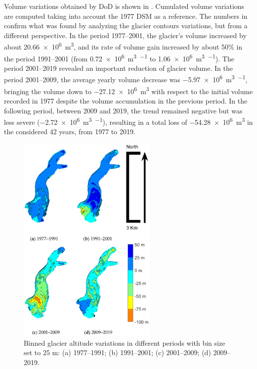 {{Volume variations obtained by DoD is shown in .
Cumulated volume variations are computed taking into account the 1977 DSM as a reference.
The numbers in  confirm what was found by analyzing the glacier contours variations, but from a different perspective. 
In the period 1977–2001, the glacier’s volume increased by about \SI[retain-explicit-plus]{+20.66e6}{\cubic\meter}, and its rate of volume gain increased by about 50\% in the period 1991–2001 (from \SI[retain-explicit-plus]{+0.72e6}{\cubic\meter\per\year} to \SI[retain-explicit-plus]{+1.06e6}{\cubic\meter\per\year}). 
The period 2001–2019 revealed an important reduction of glacier volume.
In the period 2001–2009, the average yearly volume decrease was \SI{-5.97e6}{\cubic\meter\per\year}, bringing the volume down to \SI{-27.12e6}{\cubic\meter} with respect to the initial volume recorded in 1977 despite the volume accumulation in the previous period.
In the following period, between 2009 and 2019, the trend remained negative but was less severe (\SI{-2.72e6}{\cubic\meter\per\year}), resulting in a total loss of \SI{-54.28e6}{\cubic\meter} in the considered 42 years, from 1977 to 2019.

\begin{figure}
    \centering
    \includegraphics[width=0.6\textwidth]{results_volumes_variations.png}
    \caption{Binned glacier altitude variations in different periods with bin size set to 25 m: (a) 1977–1991; (b) 1991–2001; (c) 2001–2009; (d) 2009–2019. }
    \label{fig:2:volume_variations}
\end{figure}

}}
